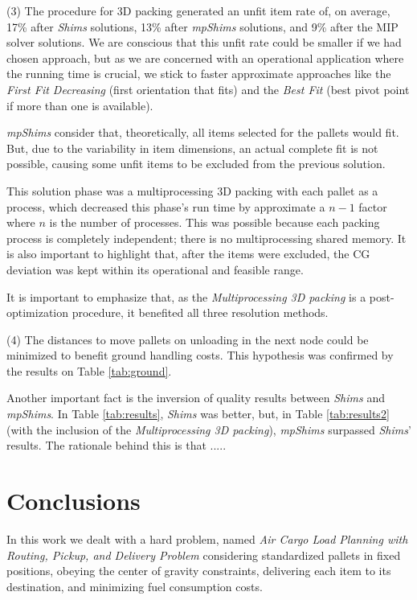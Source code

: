 \documentclass[preprint,authoryear]{elsarticle}
\begin{document}
(3) The procedure for 3D packing generated an unfit item rate of, on average, 17\% after {\it Shims} solutions, 13\% after {\it mpShims} solutions, and 9\% after the MIP solver solutions. 
We are conscious that this unfit rate could be smaller if we had chosen \cite{PaquayLimbourgSchynsOliveira2018} approach, but as we are concerned with an operational application where the running time is crucial, we stick to faster approximate approaches like the {\it First Fit Decreasing} (first orientation that fits) and the {\it Best Fit} (best pivot point if more than one is available).

{\it mpShims} consider that, theoretically, all items selected for the pallets would fit. But, due to the variability in item dimensions, an actual complete fit is not possible, causing some unfit items to be excluded from the previous solution.

This solution phase was a multiprocessing 3D packing with each pallet as a process, which decreased this phase's run time by approximate a $n-1$ factor where $n$ is the number of processes. This was possible because each packing process is completely independent; there is no multiprocessing shared memory. It is also important to highlight that, after the items were excluded, the CG deviation was kept within its operational and feasible range.

It is important to  emphasize that, as the {\it Multiprocessing 3D packing} is a post-optimization procedure, it benefited all three resolution methods.

(4) The distances to move pallets on unloading in the next node could be minimized to benefit ground handling costs.
This hypothesis was confirmed by the results on Table \ref{tab:ground}.



Another important fact is the inversion of quality results between {\it Shims} and {\it mpShims}. In Table \ref{tab:results}, {\it Shims} was better, but, in Table \ref{tab:results2} (with the inclusion of the {\it Multiprocessing 3D packing}), {\it mpShims} surpassed {\it Shims}' results. The rationale behind this is that .....

\section{Conclusions}
\label{sec7}

In this work we dealt with a hard problem, named {\it Air Cargo Load Planning with Routing, Pickup, and Delivery Problem} considering standardized pallets in fixed positions, obeying the center of gravity constraints, delivering each item to its destination, and minimizing fuel consumption costs.
\end{document}
